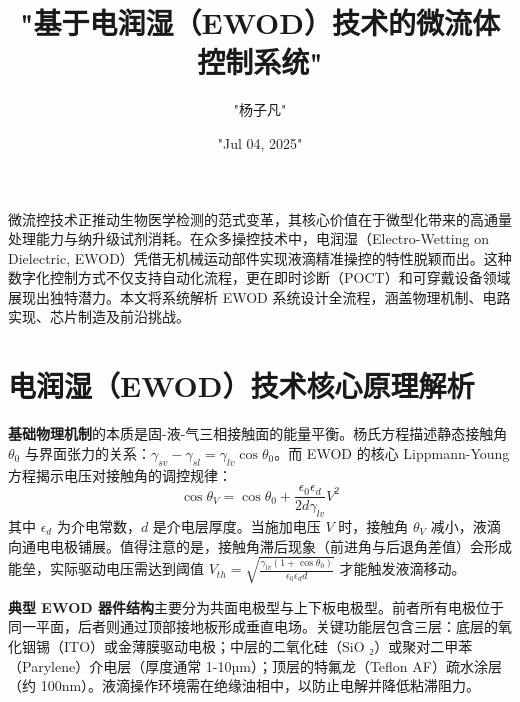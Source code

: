\title{"基于电润湿（EWOD）技术的微流体控制系统"}
\author{"杨子凡"}
\date{"Jul 04, 2025"}
\maketitle
微流控技术正推动生物医学检测的范式变革，其核心价值在于微型化带来的高通量处理能力与纳升级试剂消耗。在众多操控技术中，电润湿（Electro-Wetting on Dielectric, EWOD）凭借无机械运动部件实现液滴精准操控的特性脱颖而出。这种数字化控制方式不仅支持自动化流程，更在即时诊断（POCT）和可穿戴设备领域展现出独特潜力。本文将系统解析 EWOD 系统设计全流程，涵盖物理机制、电路实现、芯片制造及前沿挑战。\par
\chapter{电润湿（EWOD）技术核心原理解析}
\textbf{基础物理机制}的本质是固-液-气三相接触面的能量平衡。杨氏方程描述静态接触角 $\theta_0$ 与界面张力的关系：$\gamma_{sv} - \gamma_{sl} = \gamma_{lv} \cos\theta_0$。而 EWOD 的核心 Lippmann-Young 方程揭示电压对接触角的调控规律：
$$ \cos\theta_V = \cos\theta_0 + \frac{\epsilon_0 \epsilon_d}{2d \gamma_{lv}} V^2 $$
其中 $\epsilon_d$ 为介电常数，$d$ 是介电层厚度。当施加电压 $V$ 时，接触角 $\theta_V$ 减小，液滴向通电电极铺展。值得注意的是，接触角滞后现象（前进角与后退角差值）会形成能垒，实际驱动电压需达到阈值 $V_{th} = \sqrt{\frac{\gamma_{lv} (1+\cos\theta_0)}{\epsilon_0 \epsilon_d d}}$ 才能触发液滴移动。\par
\textbf{典型 EWOD 器件结构}主要分为共面电极型与上下板电极型。前者所有电极位于同一平面，后者则通过顶部接地板形成垂直电场。关键功能层包含三层：底层的氧化铟锡（ITO）或金薄膜驱动电极；中层的二氧化硅（SiO ₂）或聚对二甲苯（Parylene）介电层（厚度通常 1-10µm）；顶层的特氟龙（Teflon AF）疏水涂层（约 100nm）。液滴操作环境需在绝缘油相中，以防止电解并降低粘滞阻力。\par
